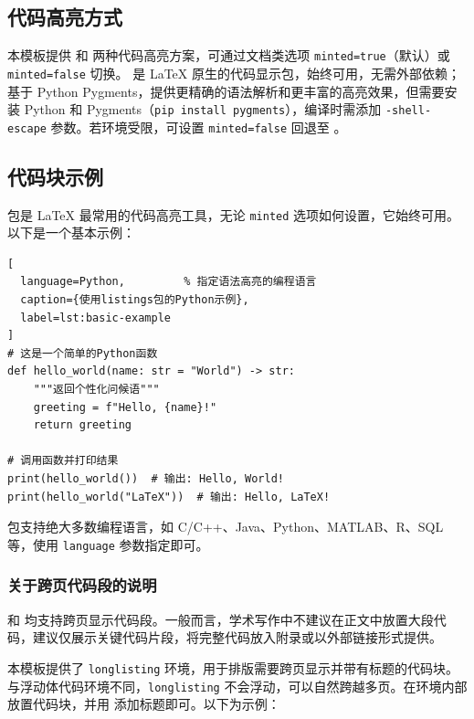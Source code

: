 \subsection{代码高亮方式}

本模板提供  和  两种代码高亮方案，可通过文档类选项 \texttt{minted=true}（默认）或 \texttt{minted=false} 切换。 是 \LaTeX{} 原生的代码显示包，始终可用，无需外部依赖； 基于 Python Pygments，提供更精确的语法解析和更丰富的高亮效果，但需要安装 Python 和 Pygments（\texttt{pip install pygments}），编译时需添加 \texttt{-shell-escape} 参数。若环境受限，可设置 \texttt{minted=false} 回退至 。

\subsection{代码块示例}

 包是 \LaTeX{} 最常用的代码高亮工具，无论 \texttt{minted} 选项如何设置，它始终可用。以下是一个基本示例：

\begin{lstlisting}[
  language=Python,         % 指定语法高亮的编程语言
  caption={使用listings包的Python示例},
  label=lst:basic-example
]
# 这是一个简单的Python函数
def hello_world(name: str = "World") -> str:
    """返回个性化问候语"""
    greeting = f"Hello, {name}!"
    return greeting

# 调用函数并打印结果
print(hello_world())  # 输出: Hello, World!
print(hello_world("LaTeX"))  # 输出: Hello, LaTeX!
\end{lstlisting}

 包支持绝大多数编程语言，如 C/C++、Java、Python、MATLAB、R、SQL 等，使用 \texttt{language} 参数指定即可。

\subsubsection{关于跨页代码段的说明}
 和  均支持跨页显示代码段。一般而言，学术写作中不建议在正文中放置大段代码，建议仅展示关键代码片段，将完整代码放入附录或以外部链接形式提供。

本模板提供了 \texttt{longlisting} 环境，用于排版需要跨页显示并带有标题的代码块。与浮动体代码环境不同，\texttt{longlisting} 不会浮动，可以自然跨越多页。在环境内部放置代码块，并用  添加标题即可。以下为示例：

